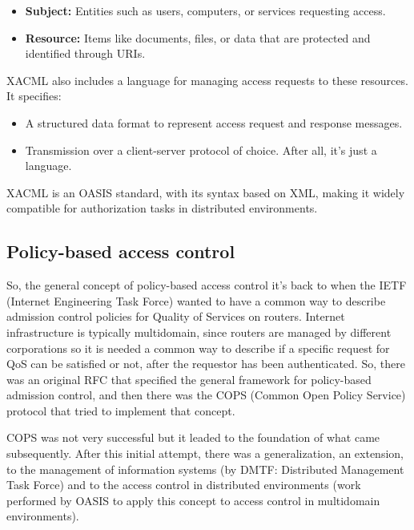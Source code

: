 \begin{itemize}
    \item \textbf{Subject:} Entities such as users, computers, or
      services requesting access.
    \item \textbf{Resource:} Items like documents, files, or data that
      are protected and identified through URIs.
\end{itemize}

XACML also includes a language for managing access requests to these
resources. It specifies:

\begin{itemize}
    \item A structured data format to represent access request and
      response messages.
    \item Transmission over a client-server protocol of choice. After
      all, it's just a language.
\end{itemize}

XACML is an OASIS standard, with its syntax based on XML, making it
widely compatible for authorization tasks in distributed environments.

\subsection{Policy-based access control}
So, the general concept of policy-based access control it’s back to
when the IETF (Internet Engineering Task Force) wanted to have a
common way to describe admission control policies for Quality of
Services on routers. Internet infrastructure is typically multidomain,
since routers are managed by different corporations so it is needed a
common way to describe if a specific request for QoS can be satisfied
or not, after the requestor has been authenticated. So, there was an
original RFC that specified the general framework for policy-based
admission control, and then there was the COPS (Common Open Policy
Service) protocol that tried to implement that concept.

COPS was not very successful but it leaded to the foundation of what
came subsequently. After this initial attempt, there was a
generalization, an extension, to the management of information systems
(by DMTF: Distributed Management Task Force) and to the access control
in distributed environments (work performed by OASIS to apply this
concept to access control in multidomain environments).

